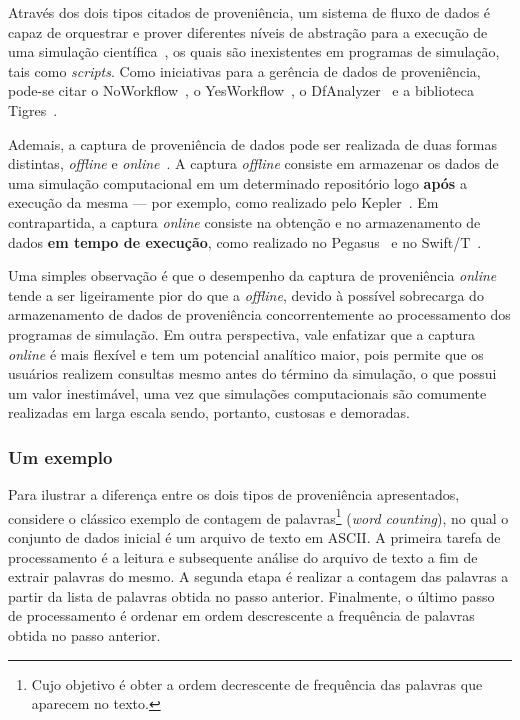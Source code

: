 Através dos dois tipos citados de proveniência, um sistema de fluxo de dados é capaz de orquestrar e prover diferentes níveis de abstração para a execução de uma simulação científica~\cite{murta2014noworkflow}, os quais são inexistentes em programas de simulação, tais como \textit{scripts}. Como iniciativas para a gerência de dados de proveniência, pode-se citar o NoWorkflow~\cite{murta2014noworkflow}, o YesWorkflow~\cite{mcphillips2015yesworkflow}, o DfAnalyzer~\cite{silva2016situ} e a biblioteca Tigres~\cite{hendrix2016tigres}.

Ademais, a captura de proveniência de dados pode ser realizada de duas formas distintas, \textit{offline} e \textit{online}~\cite{silva2015propostadoutorado}. A captura \textit{offline} consiste em armazenar os dados de uma simulação computacional em um determinado repositório logo \textbf{após} a execução da mesma --- por exemplo, como realizado pelo Kepler~\cite{ludascher2006scientific}. Em contrapartida, a captura \textit{online} consiste na obtenção e no armazenamento de dados \textbf{em tempo de execução}, como realizado no Pegasus~\cite{deelman2005pegasus} e no Swift/T~\cite{zhao2007swift}.

Uma simples observação é que o desempenho da captura de proveniência \textit{online} tende a ser ligeiramente pior do que a \textit{offline}, devido à possível sobrecarga do armazenamento de dados de proveniência concorrentemente ao processamento dos programas de simulação. Em outra perspectiva, vale enfatizar que a captura \textit{online} é mais flexível e tem um potencial analítico maior, pois permite que os usuários realizem consultas mesmo antes do término da simulação, o que possui um valor inestimável, uma vez que simulações computacionais são comumente realizadas em larga escala sendo, portanto, custosas e demoradas.

\subsubsection{Um exemplo}

Para ilustrar a diferença entre os dois tipos de proveniência apresentados, considere o clássico exemplo de contagem de palavras\footnote{Cujo objetivo é obter a ordem decrescente de frequência das palavras que aparecem no texto.} (\textit{word counting}), no qual o conjunto de dados inicial é um arquivo de texto em  ASCII. A primeira tarefa de processamento é a leitura e subsequente análise do arquivo de texto a fim de extrair palavras do mesmo. A segunda etapa é realizar a contagem das palavras a partir da lista de palavras obtida no passo anterior. Finalmente, o último passo de processamento é ordenar em ordem descrescente a frequência de palavras obtida no passo anterior.

